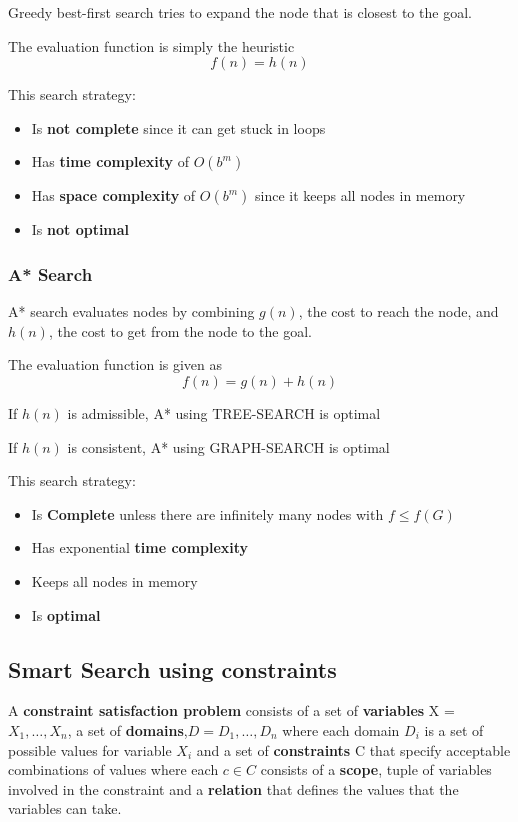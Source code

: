 \documentclass{article}
\begin{document}
Greedy best-first search tries to expand the node that is closest to the goal.

The evaluation function is simply the heuristic $$f(n) = h(n)$$

This search strategy:
\begin{itemize}
    \item Is \textbf{not complete} since it can get stuck in loops
    \item Has \textbf{time complexity} of $O(b^m)$ 
    \item Has \textbf{space complexity} of $O(b^m)$ since it keeps all nodes in memory
    \item Is \textbf{not optimal}
\end{itemize}

\subsubsection{A* Search}

A* search evaluates nodes by combining $g(n)$, the cost to reach the node, and $h(n)$, the cost to get from the node to the goal.

The evaluation function is given as $$f(n) = g(n) + h(n)$$

If $h(n)$ is admissible, A* using TREE-SEARCH is optimal

If $h(n)$ is consistent, A* using GRAPH-SEARCH is optimal \newline

This search strategy:
\begin{itemize}
    \item Is \textbf{Complete} unless there are infinitely many nodes with $f \leq f(G)$
    \item Has exponential \textbf{time complexity}
    \item Keeps all nodes in memory
    \item Is \textbf{optimal}
\end{itemize}

\subsection{Smart Search using constraints}

A \textbf{constraint satisfaction problem} consists of a set of \textbf{variables} X = ${X_1,\ldots,X_n}$, a set of \textbf{domains},$D = {D_1,\ldots,D_n}$ where each domain $D_i$ is a set of possible values for variable $X_i$ and a set of \textbf{constraints} C that specify acceptable combinations of values where each $c \in C$ consists of a \textbf{scope}, tuple of variables involved in the constraint and a \textbf{relation} that defines the values that the variables can take.
\end{document}
